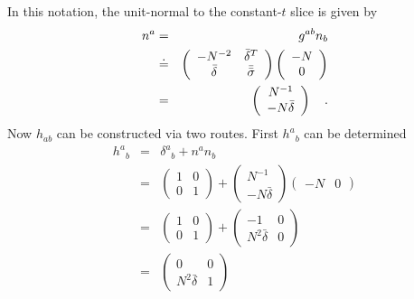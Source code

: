 \documentclass[twocolumn]{article}
\def\.{{\quad .}}
\begin{document}
In this notation, the unit-normal to the constant-$t$ slice is given by
\begin{eqnarray*}
   n^a & = &  g^{ab} n_{b} \\
       & \doteq &
   \left(
     \begin{array}{c c}
        -N^{-2}       & {\bar \delta}^{T} \\
       {\bar \delta}  & {\bar {\bar \sigma}}
     \end{array}
   \right)
%
   \left(
     \begin{array}{c}
       -N \\
       0
     \end{array}
   \right) \\
%
   & = &
   \left(
     \begin{array}{c}
       N^{-1} \\
       -N \bar \delta
     \end{array}
   \right) \.
\end{eqnarray*}
Now $h_{ab}$ can be constructed via two routes.  First ${h^{a}}_{b}$ can be
determined
\begin{eqnarray*}
   {h^{a}}_{b} & = &  {\delta^{a}}_{b} + n^{a} n_{b} \\
             & = & \left(
                      \begin{array}{cc}
                         1 & 0 \\
                         0 & 1
                      \end{array}
                   \right) +
                   \left(
                      \begin{array}{c}
                          N^{-1} \\ -N \bar \delta
                      \end{array}
                   \right)
                   \left(
                      \begin{array}{cc}
                         -N & 0
                      \end{array}
                   \right) \\
             & = & \left(
                      \begin{array}{cc}
                         1 & 0 \\
                         0 & 1
                      \end{array}
                   \right) +
                   \left(
                      \begin{array}{cc}
                         -1             & 0 \\
                         N^2 \bar \delta & 0
                      \end{array}
                   \right) \\
             & = & \left(
                      \begin{array}{cc}
                         0               & 0 \\
                         N^2 \bar \delta & 1
                      \end{array}
                   \right)
\end{eqnarray*}
\end{document}
